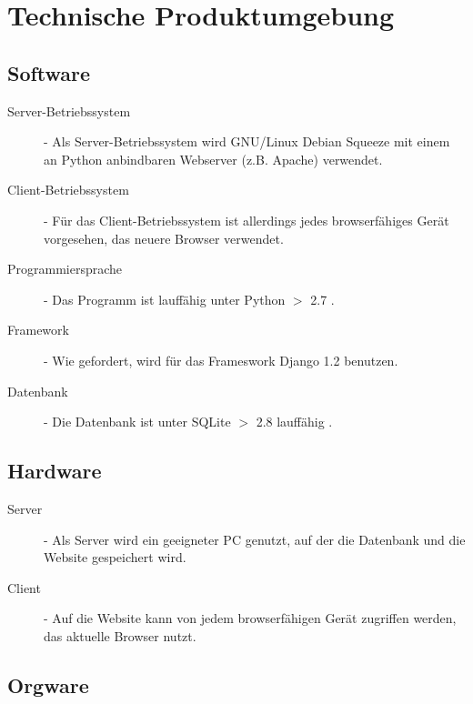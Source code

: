 
\chapter{Technische Produktumgebung}


\section{Software}


\begin{description}
\item [Server-Betriebssystem] - Als Server-Betriebssystem wird GNU/Linux Debian Squeeze mit einem an Python anbindbaren Webserver          (z.B. Apache) verwendet.																		
\item [Client-Betriebssystem] -               Für das Client-Betriebssystem ist allerdings jedes browserfähiges Gerät  vorgesehen, das neuere Browser	 verwendet. 																	
						
\item [Programmiersprache] -                 Das Programm  ist lauffähig unter Python $>$ 2.7 . 	
\item [Framework] -               Wie gefordert, wird für das Frameswork Django 1.2  benutzen.								
\item [Datenbank] - 	 Die Datenbank ist unter  SQLite $>$ 2.8  lauffähig .                                                                                
\end{description}



\section{Hardware}


\begin{description}
\item [Server] - Als Server wird ein geeigneter PC genutzt, auf der die Datenbank und die Website gespeichert wird.
\item [Client] - Auf die Website kann von jedem browserfähigen Gerät zugriffen werden, das aktuelle Browser nutzt. 
\end{description}

\section{Orgware}

